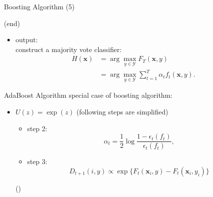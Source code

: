 \documentclass[fleqn,aspectratio=1610]{beamer}
\begin{document}
\begin{frame}[label={sec:org3f7c1a2}]{Boosting Algorithm (5)}
\begin{block}{(end)}
\begin{itemize}
\item \alert{output:}\\
construct a majority vote classifier:
\begin{align}
  H(\boldsymbol{x})
  &=\arg\max_{y\in\mathcal{Y}}F_{T}(\boldsymbol{x},y)\\
  &=\arg\max_{y\in\mathcal{Y}}\sum_{t=1}^T\alpha_{t}f_{t}(\boldsymbol{x},y).
\end{align}
\end{itemize}
\end{block}
\end{frame}
\begin{frame}[label={sec:orga4f8d17}]{AdaBoost Algorithm}
special case of boosting algorithm:
\begin{itemize}
\item \(U(z)=\exp(z)\) (following steps are simplified)
\begin{itemize}
\item \alert{step 2:}
\begin{equation}
  \alpha_t 
  = \frac{1}{2} \log \frac{1-\epsilon_t(f_t)}{\epsilon_t(f_t)},
\end{equation}
\item \alert{step 3:}
\begin{equation}
  D_{t+1}(i,y) \propto 
  \exp \{F_t(\boldsymbol{x}_i,y)-F_t(\boldsymbol{x}_i,y_i)\}
\end{equation}
\end{itemize}
(\cite{FreundSchapire1997})
\end{itemize}
\end{frame}
\end{document}
